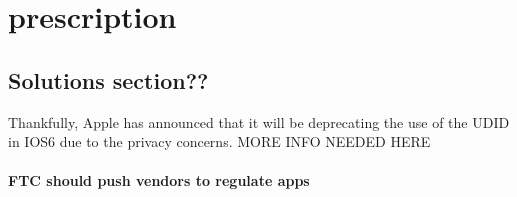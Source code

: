 \section{prescription}




\subsection{Solutions section??}

    Thankfully, Apple has announced that it will be deprecating the use of the UDID in IOS6 due to the privacy concerns. MORE INFO NEEDED HERE

\paragraph{FTC should push vendors to regulate apps}



